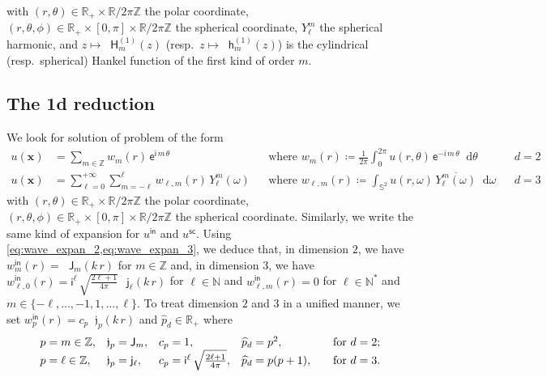 \documentclass[12pt,a4paper]{article}
\theoremstyle{definition}
\theoremstyle{plain}
\theoremstyle{remark}
\newcommand{\bbN}{\mathbb{N}}
\newcommand{\bbR}{\mathbb{R}}
\newcommand{\bbS}{\mathbb{S}}
\newcommand{\bbZ}{\mathbb{Z}}
\newcommand{\ex}{\mathsf{e}}
\newcommand{\im}{\mathsf{i}}
\newcommand{\bJ}{\mathop{}\!\mathsf{J}}
\newcommand{\Hu}{\mathop{}\!\mathsf{H}^{(1)}}
\newcommand{\bj}{\mathop{}\!\mathsf{j}}
\newcommand{\hu}{\mathop{}\!\mathsf{h}^{(1)}}
\newcommand{\frj}{\mathop{}\!\mathfrak{j}}
\newcommand{\di}[1]{\mathop{}\!\mathrm{d}#1}
\newcommand{\vx}{\boldsymbol{x}}
\newcommand{\inc}{\mathsf{in}}
\newcommand{\sca}{\mathsf{sc}}
\begin{document}
with $(r, \theta) \in \bbR_+ \times \bbR / 2\pi\bbZ$ the polar coordinate,
$(r, \theta, \phi) \in \bbR_+ \times [0, \pi] \times \bbR / 2\pi\bbZ$ the spherical coordinate, $Y_\ell^m$ the spherical harmonic, and $z \mapsto \Hu_m(z)$ (resp.\ $z \mapsto \hu_m(z)$) is the cylindrical (resp.\ spherical) Hankel function of the first kind of order $m$.

\subsection{The 1d reduction}

We look for solution of problem of the form
\begin{align*}
    u(\vx)
     & = \sum_{m \in \bbZ} w_m(r)\, \ex^{\im\, m\, \theta}
     &                                                                                     & \text{where } w_m(r) \coloneqq \frac{1}{2\pi} \int_0^{2\pi} u(r,\theta)\, \ex^{-\im\, m\, \theta} \di{\theta}
     &                                                                                     & d = 2                                                                                                         \\
    u(\vx)
     & = \sum_{\ell = 0}^{+\infty} \sum_{m = -\ell}^\ell w_{\ell, m}(r)\, Y_\ell^m(\omega)
     &                                                                                     & \text{where } w_{\ell, m}(r) \coloneqq \int_{\bbS^2} u(r, \omega)\, \overline{Y_\ell^m(\omega)} \di{\omega}
     &                                                                                     & d = 3
\end{align*}
with $(r, \theta) \in \bbR_+ \times \bbR / 2\pi\bbZ$ the polar coordinate,
$(r, \theta, \phi) \in \bbR_+ \times [0, \pi] \times \bbR / 2\pi\bbZ$ the spherical coordinate.
Similarly, we write the same kind of expansion for $u^\inc$ and $u^\sca$.
Using \cref{eq:wave_expan_2,eq:wave_expan_3}, we deduce that, in dimension $2$, we have $w_m^\inc(r) = \bJ_m(k\, r)$ for $m \in \bbZ$ and, in dimension $3$, we have $w_{\ell, 0}^\inc(r) = \im^\ell\, \sqrt{\frac{2\ell+1}{4\pi}}\, \bj_\ell(k\, r)$ for $\ell \in \bbN$ and $w_{\ell, m}^\inc(r) = 0$ for $\ell \in \bbN^*$ and $m \in \{-\ell, \ldots, -1, 1, \ldots, \ell\}$.
To treat dimension $2$ and $3$ in a unified manner, we set $w_p^\inc(r) = c_p\frj_p(k\, r)$ and $\widehat{p}_d \in \bbR_+$ where
\[
    \begin{array}{l@{\quad}l@{\quad}l@{\quad}l@{\qquad}l}
        p = m \in \bbZ,    & \frj_p = \bJ_m,    & c_p = 1,                                      & \widehat{p}_d = p^2,    & \text{for } d = 2; \\
        p = \ell \in \bbZ, & \frj_p = \bj_\ell, & c_p = \im^\ell\, \sqrt{\frac{2\ell+1}{4\pi}}, & \widehat{p}_d = p(p+1), & \text{for } d = 3.
    \end{array}
\]
\end{document}
